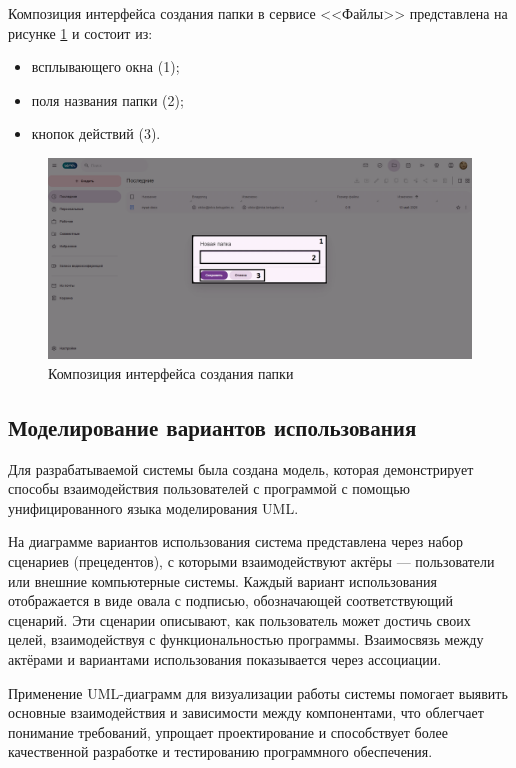 Композиция интерфейса создания папки в сервисе <<Файлы>> представлена на рисунке \ref{templ:image9d} и состоит из:
\begin{itemize}
  \item всплывающего окна (1);
  \item поля названия папки (2);
  \item кнопок действий (3).
\end{itemize}
\begin{figure}[H]
	\centering
	\includegraphics[width=1\linewidth]{images/файлы4}
	\caption{Композиция интерфейса создания папки}
	\label{templ:image9d}
\end{figure}

\clearpage
\subsection{Моделирование вариантов использования}

Для разрабатываемой системы была создана модель, которая демонстрирует способы взаимодействия пользователей с программой с помощью унифицированного языка моделирования UML.

На диаграмме вариантов использования система представлена через набор сценариев (прецедентов), с которыми взаимодействуют актёры — пользователи или внешние компьютерные системы. Каждый вариант использования отображается в виде овала с подписью, обозначающей соответствующий сценарий. Эти сценарии описывают, как пользователь может достичь своих целей, взаимодействуя с функциональностью программы. Взаимосвязь между актёрами и вариантами использования показывается через ассоциации.

Применение UML-диаграмм для визуализации работы системы помогает выявить основные взаимодействия и зависимости между компонентами, что облегчает понимание требований, упрощает проектирование и способствует более качественной разработке и тестированию программного обеспечения.

